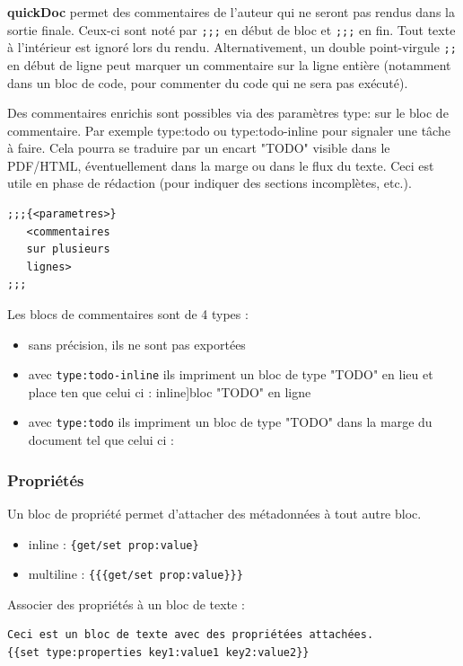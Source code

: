 \documentclass[a4paper,12pt]{article}
\def\todo#1{}%
\begin{document}
\textbf{quickDoc} permet des commentaires de l’auteur qui ne seront pas rendus dans la sortie finale. Ceux-ci sont noté par \texttt{;;;} en début de bloc et \texttt{;;;} en fin. Tout texte à l’intérieur est ignoré lors du rendu. Alternativement, un double point-virgule \texttt{;;} en début de ligne peut marquer un commentaire sur la ligne entière (notamment dans un bloc de code, pour commenter du code qui ne sera pas exécuté).

Des commentaires enrichis sont possibles via des paramètres type: sur le bloc de commentaire. Par exemple type:todo ou type:todo-inline pour signaler une tâche à faire. Cela pourra se traduire par un encart "TODO" visible dans le PDF/HTML, éventuellement dans la marge ou dans le flux du texte. Ceci est utile en phase de rédaction (pour indiquer des sections incomplètes, etc.).

\begin{verbatim}
;;;{<parametres>}
   <commentaires
   sur plusieurs
   lignes>
;;;
\end{verbatim}

Les blocs de commentaires sont de 4 types :
\begin{itemize}
\item sans précision, ils ne sont pas exportées
\item avec \texttt{type:todo-inline} ils impriment un bloc de type "TODO" en lieu et place ten que celui ci : \todo[inline]{bloc "TODO" en ligne}
\item avec \texttt{type:todo} ils impriment un bloc de type "TODO" dans la marge du document tel que celui ci : \todo{e.g.}
\end{itemize}
\subsubsection{Propriétés}
\label{sec:orgef64326}
Un bloc de propriété permet d’attacher des métadonnées à tout autre bloc.
\begin{itemize}
\item inline : \texttt{\{get/set prop:value\}}
\item multiline : \texttt{\{\{\{get/set prop:value\}\}\}}
\end{itemize}

Associer des propriétés à un bloc de texte :
\begin{verbatim}
Ceci est un bloc de texte avec des propriétées attachées.
{{set type:properties key1:value1 key2:value2}}
\end{verbatim}
\end{document}

